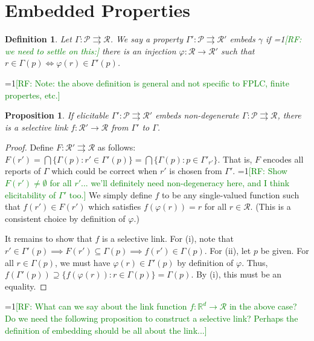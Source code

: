 \documentclass[11pt]{article}
\newcommand{\Comments}{1}
\newcommand{\mynote}[2]{\ifnum\Comments=1\textcolor{#1}{#2}\fi}
\newcommand{\raf}[1]{\mynote{green}{[RF: #1]}}
\newcommand{\reals}{\mathbb{R}}
\renewcommand{\P}{\mathcal{P}}
\newcommand{\R}{\mathcal{R}}
\newcommand{\toto}{\rightrightarrows}
\newtheorem{proposition}{Proposition}
\newtheorem{definition}{Definition}
\begin{document}
\section{Embedded Properties}

\begin{definition}
  Let $\Gamma:\P\toto\R$.
  We say a property $\Gamma':\P\toto\R'$ \emph{embeds $\gamma$} if \raf{we need to settle on this:} there is an injection $\varphi:\R\to\R'$ such that $r\in\Gamma(p) \iff \varphi(r) \in \Gamma'(p)$.
\end{definition}
\raf{Note: the above definition is general and not specific to FPLC, finite propertes, etc.}

\begin{proposition}
  If elicitable $\Gamma':\P\toto\R'$ embeds non-degenerate $\Gamma:\P\toto\R$, there is a selective link $f:\R'\to\R$ from $\Gamma'$ to $\Gamma$.
\end{proposition}
\begin{proof}
  Define $F:\R'\toto\R$ as follows: $F(r') = \bigcap\{\Gamma(p) : r'\in\Gamma'(p)\} = \bigcap\{\Gamma(p) : p \in\Gamma'_{r'}\}$.
  That is, $F$ encodes all reports of $\Gamma$ which could be correct when $r'$ is chosen from $\Gamma'$.
  \raf{Show $F(r') \neq \emptyset$ for all $r'$... we'll definitely need non-degeneracy here, and I think elicitability of $\Gamma'$ too.}
  We simply define $f$ to be any single-valued function such that $f(r') \in F(r')$ which satisfies $f(\varphi(r)) = r$ for all $r\in\R$.
  (This is a consistent choice by definition of $\varphi$.)

  It remains to show that $f$ is a selective link.
  For (i), note that $r'\in\Gamma'(p) \implies F(r') \subseteq \Gamma(p) \implies f(r') \in \Gamma(p)$.
  For (ii), let $p$ be given.
  For all $r\in\Gamma(p)$, we must have $\varphi(r) \in \Gamma'(p)$ by definition of $\varphi$.
  Thus, $f(\Gamma'(p)) \supseteq \{f(\varphi(r)) : r \in \Gamma(p)\} = \Gamma(p)$.
  By (i), this must be an equality.
\end{proof}

\raf{What can we say about the link function $f:\reals^d\to\R$ in the above case?  Do we need the following proposition to construct a selective link?  Perhaps the definition of embedding should be all about the link...}
\end{document}
